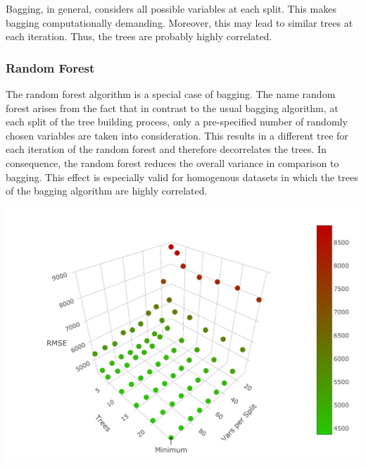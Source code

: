 \documentclass[11pt,]{article}
\let\origfigure\figure
\let\endorigfigure\endfigure
\renewenvironment{figure}[1][2] {
    \expandafter\origfigure\expandafter[H]
} {
    \endorigfigure
}
\begin{document}
Bagging, in general, considers all possible variables at each split.
This makes \ac{bagging} computationally demanding. Moreover, this may
lead to similar trees at each iteration. Thus, the trees are probably
highly correlated.

\hypertarget{random-forest}{%
\subsubsection{\texorpdfstring{Random Forest
\label{chap:rand_for}}{Random Forest }}\label{random-forest}}

The random forest algorithm is a special case of \ac{bagging}. The name
random forest arises from the fact that in contrast to the usual
\ac{bagging} algorithm, at each split of the tree building process, only
a pre-specified number of randomly chosen variables are taken into
consideration. This results in a different tree for each iteration of
the random forest and therefore decorrelates the trees. In consequence,
the random forest reduces the overall variance in comparison to
\ac{bagging}. This effect is especially valid for homogenous datasets in
which the trees of the \ac{bagging} algorithm are highly correlated.

\begin{figure}

{\centering \includegraphics{../00_data/output_paper/10_rf_plot} 

}

\caption[RMSEs of the Random Forest for Different Parameters]{\label{fig:rfrmse}Random Forest: Dependency between RMSE, the Number of Trees and the Number of Variables Included at each Split.}\label{fig:unnamed-chunk-10}
\end{figure}
\end{document}
